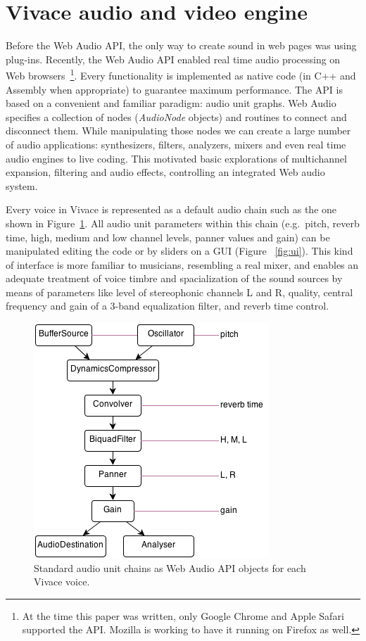 \documentclass[letterpaper, 12pt]{article}
\begin{document}
\section{Vivace audio and video engine}

Before the Web Audio API, the only way to create sound in web pages
was using plug-ins. Recently, the Web Audio API enabled real time
audio processing on Web browsers~\footnote{At the time this paper was
  written, only Google Chrome and Apple Safari supported the
  API. Mozilla is working to have it running on Firefox as
  well.}. Every functionality is implemented as native code (in C++
and Assembly when appropriate) to guarantee maximum performance. The
API is based on a convenient and familiar paradigm: audio unit
graphs. Web Audio specifies a collection of nodes (\emph{AudioNode}
objects) and routines to connect and disconnect them. While
manipulating those nodes we can create a large number of audio
applications: synthesizers, filters, analyzers, mixers and even real
time audio engines to live coding. This motivated basic explorations
of multichannel expansion, filtering and audio effects, controlling an
integrated Web audio system.

Every voice in Vivace is represented as a default audio chain such as
the one shown in Figure~\ref{fig:chain}. All audio unit parameters
within this chain (e.g.\ pitch, reverb time, high, medium and low
channel levels, panner values and gain) can be manipulated editing the
code or by sliders on a GUI (Figure ~\ref{fig:ui}). This kind of
interface is more familiar to musicians, resembling a real mixer, and
enables an adequate treatment of voice timbre and spacialization of
the sound sources by means of parameters like level of stereophonic
channels L and R, quality, central frequency and gain of a 3-band
equalization filter, and reverb time control.

\begin{figure}[htpb]
  \begin{center}
    \includegraphics[scale=.5]{img/fig_chain.png}
    \caption{Standard audio unit chains as Web Audio API objects for
      each Vivace voice.}
    \label{fig:chain}
  \end{center}
\end{figure}
\end{document}
